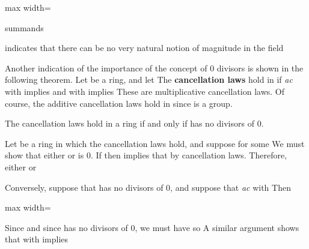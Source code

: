 \documentclass[11pt,oneside]{article}
\begin{document}
\begin{BookBody}

\begin{center}\begin{adjustbox}{max width=\linewidth}\end{adjustbox}\end{center}

 summands

\noindent indicates that there can be no very natural notion of magnitude in the field 

Another indication of the importance of the concept of 0 divisors is shown in the following theorem. Let  be a ring, and let  The\textbf{ cancellation laws} hold in  if  \textit{ac} with  implies  and  with  implies  These are multiplicative cancellation laws. Of course, the additive cancellation laws hold in  since  is a group.

 The cancellation laws hold in a ring  if and only if  has no divisors of 0.

 Let  be a ring in which the cancellation laws hold, and suppose  for some  We must show that either  or  is 0. If  then  implies that  by cancellation laws. Therefore, either  or 

Conversely, suppose that  has no divisors of 0, and suppose that  \textit{ac} with  Then

\begin{center}\begin{adjustbox}{max width=\linewidth}\end{adjustbox}\end{center}

Since  and since  has no divisors of 0, we must have  so  A similar argument shows that  with  implies \BookEnd{\blacklozenge}


\end{BookBody}
\end{document}
